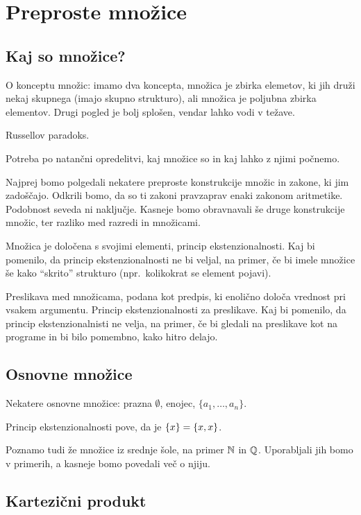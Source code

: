 \chapter{Preproste množice}
\label{cha:preproste-mnozice}

\section{Kaj so množice?}
\label{sec:kaj-so-mnoice}

O konceptu množic: imamo dva koncepta, množica je zbirka elemetov, ki jih druži nekaj skupnega (imajo skupno strukturo), ali množica je poljubna zbirka elementov. Drugi pogled je bolj splošen, vendar lahko vodi v težave.

Russellov paradoks.

Potreba po natančni opredelitvi, kaj množice so in kaj lahko z njimi počnemo.

Najprej bomo polgedali nekatere preproste konstrukcije množic in zakone, ki jim zadoščajo.
Odkrili bomo, da so ti zakoni pravzaprav enaki zakonom aritmetike. Podobnost seveda ni naključje.
Kasneje bomo obravnavali še druge konstrukcije množic, ter razliko med razredi in množicami.

Množica je določena s svojimi elementi, princip ekstenzionalnosti. Kaj bi pomenilo, da
princip ekstenzionalnosti ne bi veljal, na primer, če bi imele množice še kako ``skrito''
strukturo (npr.\ kolikokrat se element pojavi).

Preslikava med množicama, podana kot predpis, ki enolično določa vrednost pri vsakem
argumentu. Princip ekstenzionalnosti za preslikave. Kaj bi pomenilo, da princip
ekstenzionalnisti ne velja, na primer, če bi gledali na preslikave kot na programe in bi
bilo pomembno, kako hitro delajo.

\section{Osnovne množice}
\label{sec:osnovne-mnozice}

Nekatere osnovne množice: prazna $\emptyset$, enojec, $\{a_1, \ldots, a_n\}$.

Princip ekstenzionalnosti pove, da je $\set{x} = \set{x, x}$.

Poznamo tudi že množice iz srednje šole, na primer $\mathbb{N}$ in $\mathbb{Q}$. Uporabljali jih bomo v
primerih, a kasneje bomo povedali več o njiju.

\section{Kartezični produkt}
\label{sec:kartezicni-produkt}

